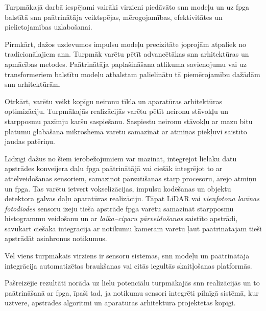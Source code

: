 

Turpmākajā darbā iespējami vairāki virzieni piedāvāto \Gls{snn} modeļu un uz \Gls{fpga} balstītā \Gls{snn} paātrinātāja
veiktspējas, mērogojamības, efektivitātes un pielietojamības uzlabošanai.

Pirmkārt, dažos uzdevumos impulsu modeļu precizitāte joprojām atpaliek no tradicionālajiem \Gls{ann}. Turpmāk varētu pētīt
advancētākas \Gls{snn} arhitektūras un apmācības metodes. Paātrinātāja paplašināšana atlikuma savienojumu vai uz
transformeriem balstītu modeļu atbalstam palielinātu tā piemērojamību dažādām \Gls{snn} arhitektūrām.

Otrkārt, varētu veikt kopīgu neironu tīkla un aparatūras arhitektūras optimizāciju. Turpmākajās realizācijās varētu pētīt
neironu stāvokļu un starpposmu pazīmju karšu saspiešanu. Saspiestu neironu stāvokļu ar mazu bitu platumu glabāšana mikroshēmā
varētu samazināt ar atmiņas piekļuvi saistīto jaudas patēriņu.

Līdzīgi dažus no šiem ierobežojumiem var mazināt, integrējot lielāku datu apstrādes konveijera daļu \Gls{fpga} paātrinātājā
vai ciešāk integrējot to ar attēlveidošanas sensoriem, samazinot pārsūtīšanas starp procesoru, ārējo
atmiņu un \Gls{fpga}. Tas varētu ietvert vokselizācijas, impulsu kodēšanas un objektu detektora galvas daļu aparatūras
realizāciju. Tāpat LiDAR vai \textit{vienfotona lavīnas fotodiodes}  sensoru izeju tieša apstrāde \Gls{fpga}
varētu samazināt starpposmu histogrammu veidošanu un ar \textit{laika–ciparu pārveidošanas}  saistīto apstrādi, savukārt ciešāka integrācija ar notikumu kamerām
varētu ļaut paātrinātājam tieši apstrādāt asinhronus notikumus.

Vēl viens turpmākais virziens ir sensoru sistēmas, \Gls{snn} modeļu un paātrinātāja integrācija automatizētas braukšanas vai
citās iegultās skaitļošanas platformās.

Pašreizējie rezultāti norāda uz lielu potenciālu turpmākajās \Gls{snn} realizācijās un to paātrināšanā ar \Gls{fpga}, īpaši
tad, ja notikumu sensori integrēti pilnīgā sistēmā, kur uztvere, apstrādes algoritmi un aparatūras arhitektūra projektētas
kopīgi.
